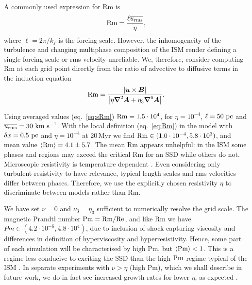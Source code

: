 \documentclass[preprint2]{aastex63}
\newcommand\Rm{{\rm Rm} }
\newcommand\Rey{{\rm Re} }
\newcommand\Pm{{\rm Pm} }
\newcommand{\vect}[1]{{{\mbox{\boldmath $#1$}}}}%
\newcommand\pc{~ {\rm pc}}
\newcommand\dx{ {\delta x}}
\newcommand\kms{~ {\rm km~ s}^{-1}}
\begin{document}
 A commonly used expression for Rm is 
 \begin{equation}\label{eq:sRm}
 \Rm=\frac{\ell \overline{u_{\rm rms}}}{\eta},
\end{equation}
 where $\ell = 2 \pi/k_f$ is the forcing scale.
 However, the inhomogeneity of the turbulence and changing multiphase
 composition of the ISM render defining a single forcing scale or rms velocity
 unreliable.
 We, therefore, consider computing Rm at each grid point directly from the
 ratio of advective to diffusive terms in the induction equation
 \begin{eqnarray}\label{eq:Rm}
   \Rm = \frac{\left|\vect{u}\times\vect{B}\right|}{
     \left|\eta\vect\nabla^2\vect{A}+\eta_3\vect\nabla^6\vect{A}\right|}.
 \end{eqnarray}

 Using averaged values (eq.~\eqref{eq:sRm}) 
 $\Rm = 1.5 \cdot 10^4$, for $\eta=10^{-4}$, $\ell=50\pc$ and
 $\overline{u_{\rm rms}}=30\kms$.
 With the local definition (eq.~\eqref{eq:Rm}) in the model with 
 $\dx=0.5\pc$ and $\eta=10^{-4}$ at 20\,Myr we find
 $\Rm\in(1.0\cdot10^{-4},5.8\cdot 10^3)$,
 and mean value $\langle\Rm\rangle=4.1\pm5.7$.
 The mean Rm appears unhelpful:
 in the ISM some phases and regions may exceed the critical Rm for an
 SSD while others do not.
 Microscopic resistivity is temperature dependent \citep{CSR50}.
 Even considering only turbulent resistivity to have relevance, 
 typical length scales and rms velocities differ between phases.
 Therefore, we use the explicitly chosen resistivity $\eta$ to discriminate
 between models rather than Rm.

 We have set $\nu=0$ and $\nu_3=\eta_3$ sufficient to numerically resolve the
 grid scale.
 The magnetic Prandtl number $\Pm = \Rm/\Rey$, and like Rm we have
 $Pm\in(4.2\cdot10^{-6},4.8\cdot10^{4})$, due 
 to inclusion of shock capturing viscosity and differences in
 definition of hyperviscosity and hyperresistivity.
 Hence, some part of each simulation will be characterised by high Pm,
 but $\langle\Pm\rangle<1$.
 This is a regime less conducive to exciting the SSD than the high $\Pm$ regime
 typical of the ISM \citep{HBD04}.
 In separate experiments with $\nu>\eta$ (high Pm), which we shall describe in
 future work, we do in fact see increased growth rates for lower $\eta$, as
 expected \citep{Sch07}.
\end{document}
